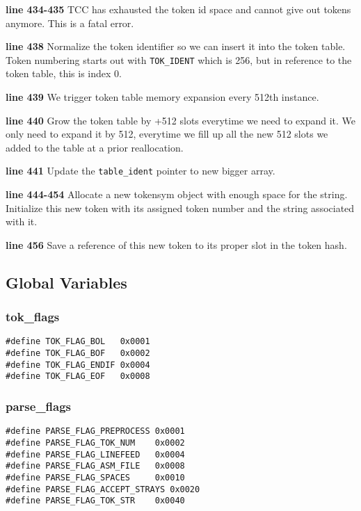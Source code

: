 \begin{tcc_desc}
\textbf{line 434-435} TCC has exhausted the token id space and cannot give out tokens anymore. This is a fatal error.

\textbf{line 438} Normalize the token identifier so we can insert it into the token table. Token numbering starts out with \verb|TOK_IDENT| which is 256, but in reference to the token table, this is index 0.

\textbf{line 439} We trigger token table memory expansion every 512th instance.

\textbf{line 440} Grow the token table by +512 slots everytime we need to expand it. We only need to expand it by 512, everytime we fill up all the new 512 slots we added to the table at a prior reallocation.

\textbf{line 441} Update the \verb|table_ident| pointer to new bigger array.

\textbf{line 444-454} Allocate a new tokensym object with enough space for the string. Initialize this new token with its assigned token number and the string associated with it.

\textbf{line 456} Save a reference of this new token to its proper slot in the token hash.
\end{tcc_desc}

\subsection{Global Variables}

\subsubsection{tok\_flags}

\begin{verbatim}
#define TOK_FLAG_BOL   0x0001
#define TOK_FLAG_BOF   0x0002
#define TOK_FLAG_ENDIF 0x0004
#define TOK_FLAG_EOF   0x0008
\end{verbatim}


\subsubsection{parse\_flags}

\begin{verbatim}
#define PARSE_FLAG_PREPROCESS 0x0001
#define PARSE_FLAG_TOK_NUM    0x0002
#define PARSE_FLAG_LINEFEED   0x0004
#define PARSE_FLAG_ASM_FILE   0x0008
#define PARSE_FLAG_SPACES     0x0010
#define PARSE_FLAG_ACCEPT_STRAYS 0x0020
#define PARSE_FLAG_TOK_STR    0x0040
\end{verbatim}

